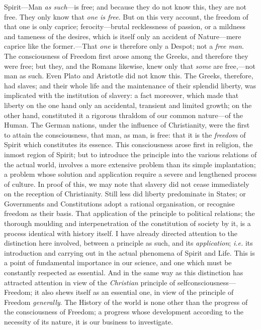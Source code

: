 Spirit---Man \textit{as such}---is free; and because  they do
not know this, they are not free. They only know that \textit{one is
free}. But on this very account, the freedom of that one is only
caprice; ferocity---brutal recklessness of passion, or a mildness and
tameness of the desires, which is itself only an accident of
Nature---mere caprice like the former.---That \textit{one} is
therefore only a Despot; not a \textit{free man}. The consciousness of
Freedom first arose among the Greeks, and therefore they were free;
but they, and the Romans likewise, knew only that \textit{some} are
free,---not man as such. Even Plato and Aristotle did not know this.
The Greeks, therefore, had slaves; and their whole life and the
maintenance of their splendid liberty, was implicated with the
institution of slavery: a fact moreover, which made that liberty on
the one hand only an accidental, transient and limited growth; on the
other hand, constituted it a rigorous thraldom of our common
nature---of the Human. The German nations, under the influence of
Christianity, were the first to attain the consciousness, that man, as
man, is free: that it is the \textit{freedom} of Spirit which
constitutes its essence. This consciousness arose first in religion,
the inmost region of Spirit; but to introduce the principle into the
various relations of the actual world, involves a more extensive
problem than its simple implantation; a problem whose solution and
application require a severe and lengthened process of culture. In
proof of this, we may note that slavery did not cease immediately on
the reception of Christianity. Still less did liberty predominate in
States; or Governments and Constitutions adopt a rational
organisation, or recognise freedom as their basis. That application
of the principle to political relations; the thorough moulding and
interpenetration of the constitution of society by it, is a process
identical with history itself. I have already directed attention to
the distinction here involved, between a principle as such, and its
\textit{application}; \textit{i.e.} its introduction and carrying out
in the actual phenomena of Spirit and Life. This is a point of
fundamental importance in our science, and one which must be
constantly respected as essential. And in the same way as this
distinction has attracted attention in view of the \textit{Christian}
principle of selfconsciousness---Freedom; it also shews itself as an
essential one, in view of the principle of Freedom \textit{generally}.
The History of the world is none other  than the progress of
the consciousness of Freedom; a progress whose development according
to the necessity of its nature, it is our business to investigate.


